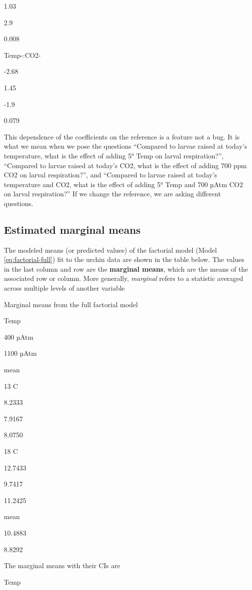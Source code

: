 \documentclass[]{book}
\begin{document}
1.03

2.9

0.008

Temp-:CO2-

-2.68

1.45

-1.9

0.079

This dependence of the coefficients on the reference is a feature not a
bug. It is what we mean when we pose the questions ``Compared to larvae
raised at today's temperature, what is the effect of adding 5° Temp on
larval respiration?'', ``Compared to larvae raised at today's CO2, what
is the effect of adding 700 ppm CO2 on larval respiration?'', and
``Compared to larvae raised at today's temperature and CO2, what is the
effect of adding 5° Temp and 700 µAtm CO2 on larval respiration?'' If we
change the reference, we are asking different questions.

\subsection{Estimated marginal means}\label{estimated-marginal-means}

The modeled means (or predicted values) of the factorial model (Model
\eqref{eq:factorial-full}) fit to the urchin data are shown in the table
below. The values in the last column and row are the \textbf{marginal
means}, which are the means of the associated row or column. More
generally, \emph{marginal} refers to a statistic averaged across
multiple levels of another variable

\label{tab:factorial-means}Marginal means from the full factorial model

Temp

400 µAtm

1100 µAtm

mean

13 C

8.2333

7.9167

8.0750

18 C

12.7433

9.7417

11.2425

mean

10.4883

8.8292

The marginal means with their CIs are

Temp
\end{document}
